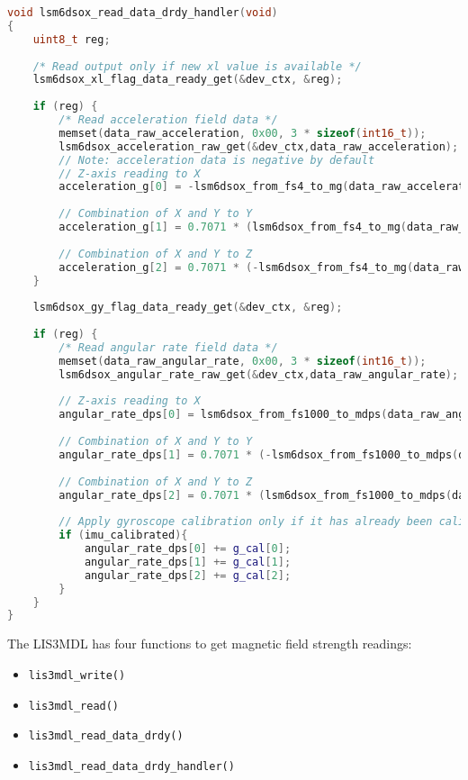 \documentclass[12pt,a4paper]{report}
\begin{document}
\begin{lstlisting}[language=C++]
void lsm6dsox_read_data_drdy_handler(void)
{
	uint8_t reg;
	
	/* Read output only if new xl value is available */
	lsm6dsox_xl_flag_data_ready_get(&dev_ctx, &reg);
	
	if (reg) {
		/* Read acceleration field data */
		memset(data_raw_acceleration, 0x00, 3 * sizeof(int16_t));
		lsm6dsox_acceleration_raw_get(&dev_ctx,data_raw_acceleration); 
		// Note: acceleration data is negative by default
		// Z-axis reading to X
		acceleration_g[0] = -lsm6dsox_from_fs4_to_mg(data_raw_acceleration[2]) / 1000.0; 
		
		// Combination of X and Y to Y
		acceleration_g[1] = 0.7071 * (lsm6dsox_from_fs4_to_mg(data_raw_acceleration[0]) / 1000.0 + lsm6dsox_from_fs4_to_mg(data_raw_acceleration[1]) / 1000.0);    
		
		// Combination of X and Y to Z
		acceleration_g[2] = 0.7071 * (-lsm6dsox_from_fs4_to_mg(data_raw_acceleration[0]) / 1000.0 + lsm6dsox_from_fs4_to_mg(data_raw_acceleration[1]) / 1000.0);   
	}
	
	lsm6dsox_gy_flag_data_ready_get(&dev_ctx, &reg);
	
	if (reg) {
		/* Read angular rate field data */
		memset(data_raw_angular_rate, 0x00, 3 * sizeof(int16_t));
		lsm6dsox_angular_rate_raw_get(&dev_ctx,data_raw_angular_rate);
		
		// Z-axis reading to X
		angular_rate_dps[0] = lsm6dsox_from_fs1000_to_mdps(data_raw_angular_rate[2]) / 1000.0;
		
		// Combination of X and Y to Y          
		angular_rate_dps[1] = 0.7071 * (-lsm6dsox_from_fs1000_to_mdps(data_raw_angular_rate[0]) / 1000.0 - lsm6dsox_from_fs1000_to_mdps(data_raw_angular_rate[1]) / 1000.0);
		
		// Combination of X and Y to Z
		angular_rate_dps[2] = 0.7071 * (lsm6dsox_from_fs1000_to_mdps(data_raw_angular_rate[0]) / 1000.0 - lsm6dsox_from_fs1000_to_mdps(data_raw_angular_rate[1]) / 1000.0);
		
		// Apply gyroscope calibration only if it has already been calibrated
		if (imu_calibrated){
			angular_rate_dps[0] += g_cal[0];
			angular_rate_dps[1] += g_cal[1];
			angular_rate_dps[2] += g_cal[2];
		}
	}
}
\end{lstlisting}

The LIS3MDL has four functions to get magnetic field strength readings:
\begin{itemize}[noitemsep,topsep=0pt,]
	\item \verb|lis3mdl_write()|
	\item \verb|lis3mdl_read()|
	\item \verb|lis3mdl_read_data_drdy()|
	\item \verb|lis3mdl_read_data_drdy_handler()|
\end{itemize}
\end{document}
